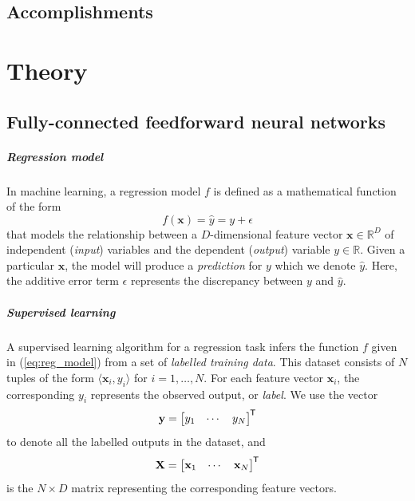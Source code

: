 \documentclass[oneside]{book}
\renewcommand\vec{\mathbf}
\newcommand*{\tran}{^{\mkern-1.5mu\mathsf{T}}}
\begin{document}
\section{Accomplishments}

\chapter{Theory}
\section{Fully-connected feedforward neural networks}

\paragraph{Regression model}
In machine learning, a regression model $f$ is defined as a mathematical function of the form
\begin{equation}
    \label{eq:reg_model}
    f(\vec{x}) = \hat{y} = y + \epsilon
\end{equation}
that models the relationship between a $D$-dimensional feature vector $\vec{x} \in \mathbb{R}^D$ of independent (\textit{input}) variables and the dependent (\textit{output}) variable $y \in \mathbb{R}$. 
Given a particular $\vec{x}$, the model will produce a \textit{prediction} for $y$ which we denote $\hat{y}$.
Here, the additive error term $\epsilon$ represents the discrepancy between $y$ and $\hat{y}$.

\paragraph{Supervised learning}
A supervised learning algorithm for a regression task infers the function $f$ given in (\ref{eq:reg_model}) from a set of \textit{labelled training data}. This dataset consists of $N$ tuples of the form $\langle \vec{x}_i, y_i\rangle$ for $i=1,\dots,N$.
For each feature vector $\vec{x}_i$, the corresponding $y_i$ represents the observed output, or \textit{label}.
We use the vector
\begin{equation}
    \vec{y} = \begin{bmatrix}
        y_1 & \cdots & y_N
    \end{bmatrix}\tran
\end{equation}
to denote all the labelled outputs in the dataset, and
\begin{equation}
    \vec{X} = \begin{bmatrix}
        \vec{x}_1 & \cdots & \vec{x}_N
    \end{bmatrix}\tran
\end{equation}
is the $N \times D$ matrix representing the corresponding feature vectors.
\end{document}
